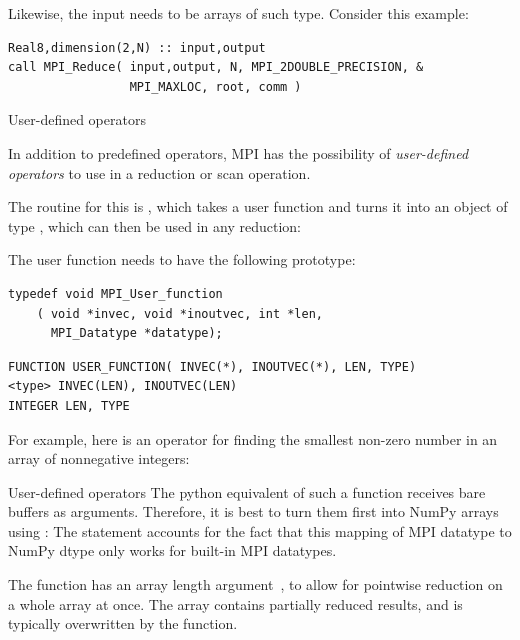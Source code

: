 Likewise, the input needs to be arrays of such type. Consider this example:
\lstset{language=Fortran}
\begin{lstlisting}
Real8,dimension(2,N) :: input,output
call MPI_Reduce( input,output, N, MPI_2DOUBLE_PRECISION, &
                 MPI_MAXLOC, root, comm )
\end{lstlisting}
\lstset{language=C}

 {User-defined operators}
\label{sec:mpi-op-create}

In addition to predefined operators, MPI has the possibility of
\emph{user-defined operators}
to use in a reduction or scan operation.

The routine for this is ,
which takes a user function and turns it into
an object of type , which can then be
used in any reduction:
%
%

The user function needs to have the following prototype:

\lstset{language=C}
\begin{lstlisting}
typedef void MPI_User_function
    ( void *invec, void *inoutvec, int *len, 
      MPI_Datatype *datatype); 
\end{lstlisting}

\lstset{language=Fortran}
\begin{lstlisting}
FUNCTION USER_FUNCTION( INVEC(*), INOUTVEC(*), LEN, TYPE) 
<type> INVEC(LEN), INOUTVEC(LEN) 
INTEGER LEN, TYPE 
\end{lstlisting}
\lstset{language=C}

For example, here is an operator for finding the smallest non-zero
number in an array of nonnegative integers:
%

\begin{pythonnote}{User-defined operators}
  The python equivalent of such a function receives bare buffers as
  arguments. Therefore, it is best to turn them first into NumPy arrays
  using :
  The  statement accounts for the fact that this mapping of
  MPI datatype to NumPy dtype only works for built-in MPI datatypes.
\end{pythonnote}

The function has an array length argument~, to allow for
pointwise reduction on a whole array at once. The  array
contains partially reduced results, and is typically overwritten by
the function.

